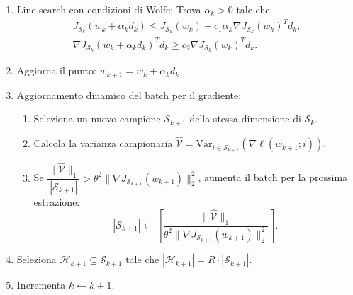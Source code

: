 \documentclass[a4paper,12pt]{article}
\numberwithin{equation}{section}
\numberwithin{figure}{section}
\numberwithin{table}{section}
\newcommand{\Var}{\mathrm{Var}}
\begin{document}
\begin{actionbox}
\begin{enumerate}
    \item Line search con condizioni di Wolfe:
    Trova $\alpha_k > 0$ tale che:
    \[
    \begin{gathered}
    J_{\mathcal{S}_k}(w_k + \alpha_k d_k) \le J_{\mathcal{S}_k}(w_k) + c_1 \alpha_k \nabla J_{\mathcal{S}_k}(w_k)^T d_k,\\
    \nabla J_{\mathcal{S}_k}(w_k + \alpha_k d_k)^T d_k \ge c_2 \nabla J_{\mathcal{S}_k}(w_k)^T d_k.
    \end{gathered}
    \]
    
    \item Aggiorna il punto: $w_{k+1} = w_k + \alpha_k d_k$.
    
    \item Aggiornamento dinamico del batch per il gradiente:
    \begin{enumerate}
    \setlength{\itemsep}{0pt}\setlength{\topsep}{0pt}\setlength{\parskip}{0pt}
      \item Seleziona un nuovo campione $\mathcal{S}_{k+1}$ della stessa dimensione di $\mathcal{S}_k$.
      \item Calcola la varianza campionaria $\widehat{\mathcal{V}} = \Var_{i \in \mathcal{S}_{k+1}}(\nabla \ell(w_{k+1};i))$.
      \item Se $\dfrac{\|\widehat{\mathcal{V}}\|_1}{|\mathcal{S}_{k+1}|} > \theta^2 \|\nabla J_{\mathcal{S}_{k+1}}(w_{k+1})\|_2^2$, aumenta il batch per la prossima estrazione:
      \[
      |\mathcal{S}_{k+1}| \leftarrow \left\lceil \dfrac{\|\widehat{\mathcal{V}}\|_1}{\theta^2 \|\nabla J_{\mathcal{S}_{k+1}}(w_{k+1})\|_2^2} \right\rceil.
      \]
    \end{enumerate}
    
    \item
    Seleziona $\mathcal{H}_{k+1} \subseteq \mathcal{S}_{k+1}$ tale che $|\mathcal{H}_{k+1}| = R \cdot |\mathcal{S}_{k+1}|$.
    
    \item Incrementa $k \leftarrow k+1$.
  \end{enumerate}
\end{actionbox}
\end{document}
